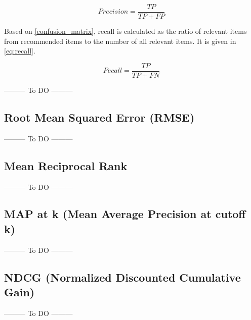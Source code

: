 \begin{equation}
Precision = \frac{TP}{TP + FP} 
\label{eq:precision}
\end{equation}

Based on \autoref{confusion_matrix}, recall is calculated as the ratio of relevant items from recommended items to the number of all relevant items. It is given in \autoref{eq:recall}. 

\begin{equation}
Pecall = \frac{TP}{TP + FN} 
\label{eq:recall}
\end{equation}

--------- To DO ---------
\subsection{Root Mean Squared Error (RMSE)}
--------- To DO ---------
\subsection{Mean Reciprocal Rank}
--------- To DO ---------
\subsection{MAP at k (Mean Average Precision at cutoff k)}
--------- To DO ---------
\subsection{NDCG (Normalized Discounted Cumulative Gain)}
--------- To DO ---------